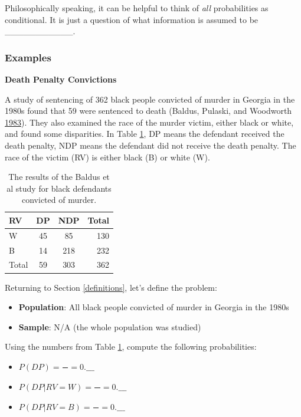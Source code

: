 \documentclass[]{book}
\providecommand{\tightlist}{%
  \setlength{\itemsep}{0pt}\setlength{\parskip}{0pt}}
\theoremstyle{definition}
\theoremstyle{definition}
\theoremstyle{remark}
\begin{document}
Philosophically speaking, it can be helpful to think of \emph{all}
probabilities as conditional. It is just a question of what information
is assumed to be \_\_\_\_\_\_\_\_\_\_\_.

\subsubsection{Examples}\label{examples-1}

\textbf{Death Penalty Convictions}

A study of sentencing of 362 black people convicted of murder in Georgia
in the 1980s found that 59 were sentenced to death (Baldus, Pulaski, and
Woodworth \protect\hyperlink{ref-baldus}{1983}). They also examined the
race of the murder victim, either black or white, and found some
disparities. In Table \ref{tab:dp}, DP means the defendant received the
death penalty, NDP means the defendant did not receive the death
penalty. The race of the victim (RV) is either black (B) or white (W).

\begin{table}
\centering
\begin{tabular}{l|cc|r}
RV & DP & NDP & Total \\
\hline
W & 45 & 85 & 130 \\
B & 14 & 218 & 232 \\
\hline
Total & 59 & 303 & 362
\end{tabular}
\caption{\label{tab:dp}The results of the Baldus et al study for black defendants convicted of murder.}
\end{table}

Returning to Section \ref{definitions}, let's define the problem:

\begin{itemize}
\tightlist
\item
  \textbf{Population}: All black people convicted of murder in Georgia
  in the 1980s
\item
  \textbf{Sample}: N/A (the whole population was studied)
\end{itemize}

Using the numbers from Table \ref{tab:dp}, compute the following
probabilities:

\begin{itemize}
\tightlist
\item
  \(P(DP) = \frac{\quad}{\quad} = 0.\_\_\_\) \vspace{.1in}
\item
  \(P(DP | RV = W) = \frac{\quad}{\quad} = 0.\_\_\_\) \vspace{.1in}
\item
  \(P(DP | RV = B) = \frac{\quad}{\quad} = 0.\_\_\_\) \vspace{.1in}
\end{itemize}
\end{document}
